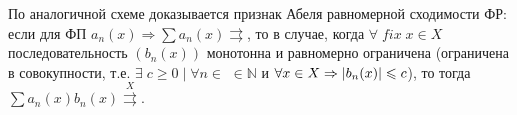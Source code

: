 \begin{note}
	По аналогичной схеме доказывается признак Абеля равномерной сходимости ФР: если для ФП 	$a_n(x) \Rightarrow \sum a_n (x) \rightrightarrows$, то в случае, когда $\forall \; fix \; x \in X$ последовательность $\left(b_n(x)\right)$ монотонна и равномерно ограничена (ограничена в совокупности, т.е. $\exists \; c \geqslant 0 \; | \; \forall n \in$ $\in \mathbb{N} $ и $ \forall x \in X \Rightarrow \left\lvert b_n(x) \right\rvert \leqslant c $), то тогда $\sum a_n(x) b_n(x) \overset{X}{\rightrightarrows} $.
\end{note}
